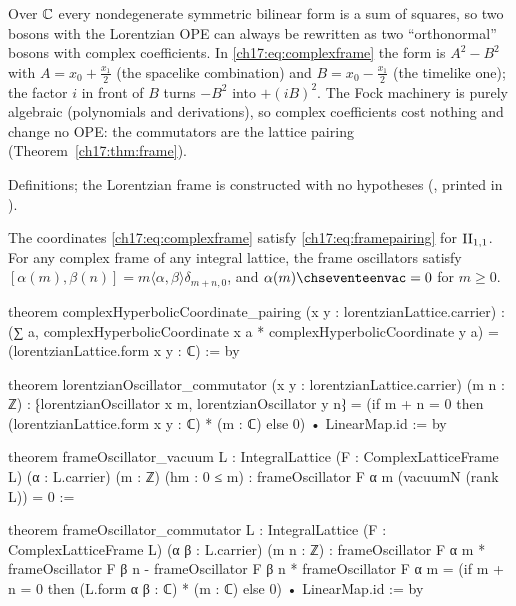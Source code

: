 \begin{physics}
Over ${\mathbb{C}}$ every nondegenerate symmetric bilinear form is a sum of squares, so two bosons with the Lorentzian
OPE can always be rewritten as two ``orthonormal'' bosons with complex coefficients.  In
\eqref{ch17:eq:complexframe} the form is $A^2-B^2$ with $A=x_0+\frac{x_1}2$ (the spacelike combination) and
$B=x_0-\frac{x_1}2$ (the timelike one); the factor $i$ in front of $B$ turns $-B^2$ into $+(iB)^2$.  The Fock
machinery is purely algebraic (polynomials and derivations), so complex coefficients cost nothing and change no
OPE: the commutators are the lattice pairing (Theorem~\ref{ch17:thm:frame}).
\end{physics}

\begin{status}
Definitions; the Lorentzian frame is constructed with no hypotheses
(, printed in ).
\end{status}

\begin{theorem}\label{ch17:thm:frame}
The coordinates \eqref{ch17:eq:complexframe} satisfy \eqref{ch17:eq:framepairing} for ${\mathrm{II}_{1,1}}$.  For any
complex frame of any integral lattice, the frame oscillators satisfy
$[\alpha(m),\beta(n)]=m\langle\alpha,\beta\rangle\delta_{m+n,0}$, and $\alpha(m)\chseventeenvac=0$ for $m\ge0$.
\end{theorem}

\begin{leancode}
theorem complexHyperbolicCoordinate_pairing (x y : lorentzianLattice.carrier) :
    (∑ a, complexHyperbolicCoordinate x a * complexHyperbolicCoordinate y a) =
      (lorentzianLattice.form x y : ℂ) := by

theorem lorentzianOscillator_commutator (x y : lorentzianLattice.carrier) (m n : ℤ) :
    ⁅lorentzianOscillator x m, lorentzianOscillator y n⁆ =
      (if m + n = 0 then (lorentzianLattice.form x y : ℂ) * (m : ℂ) else 0) •
        LinearMap.id := by

theorem frameOscillator_vacuum {L : IntegralLattice} (F : ComplexLatticeFrame L)
    (α : L.carrier) (m : ℤ) (hm : 0 ≤ m) :
    frameOscillator F α m (vacuumN (rank L)) = 0 :=

theorem frameOscillator_commutator {L : IntegralLattice} (F : ComplexLatticeFrame L)
    (α β : L.carrier) (m n : ℤ) :
    frameOscillator F α m * frameOscillator F β n -
      frameOscillator F β n * frameOscillator F α m =
      (if m + n = 0 then (L.form α β : ℂ) * (m : ℂ) else 0) • LinearMap.id := by
\end{leancode}

